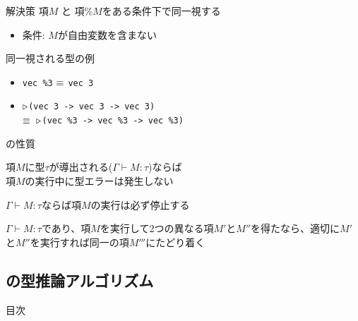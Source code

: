 \documentclass[dvipdfmx,aspectratio=169, 20pt]{beamer}
\begin{document}
\begin{frame}[fragile]{解決策}
    項\( M \) と 項\( \%M \)をある条件下で同一視する
    \begin{itemize}
        \item 条件: \( M \)が自由変数を含まない
    \end{itemize}
    \begin{exampleblock}{同一視される型の例}
        \begin{itemize}
            \item \verb|vec %3| \( \equiv \) \verb|vec 3|
            \item \({\mathop{\triangleright}}\)\verb|(vec 3 -> vec 3 -> vec 3)| \\
                \( \equiv \)\ \({\mathop{\triangleright}}\)\verb|(vec %3 -> vec %3 -> vec %3)|
        \end{itemize}
    \end{exampleblock}
\end{frame}

\begin{frame}[fragile]{\LMD の性質}
    \begin{theorem}[型安全性]
        項\(M\)に型\(\tau\)が導出される(\(\Gamma \vdash M : \tau \))ならば\\
        項\(M\)の実行中に型エラーは発生しない
    \end{theorem}
    \begin{theorem}[強正規化性]
        \(\Gamma \vdash M : \tau \)ならば項\(M\)の実行は必ず停止する
    \end{theorem}
    \begin{theorem}[合流性]
        \(\Gamma \vdash M : \tau \)であり、項\(M\)を実行して2つの異なる項\(M'\)と\(M''\)を得たなら、適切に\(M'\)と\(M''\)を実行すれば同一の項\(M'''\)にたどり着く
    \end{theorem}
\end{frame}

\subsection{\LMD の型推論アルゴリズム}

\begin{frame}{目次}
    \tableofcontents[currentsection]
\end{frame}
\end{document}
